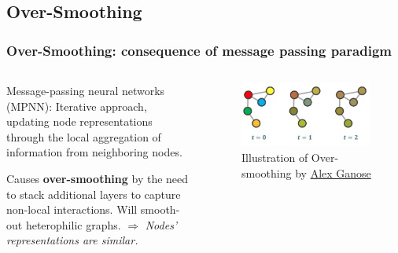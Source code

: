 \documentclass[10pt, aspectratio = 169]{beamer}
\begin{document}
\subsection{Over-Smoothing}
\begin{frame}
    \frametitle{Over-Smoothing: consequence of message passing paradigm}
    \begin{columns}
        \begin{column}{0.6\textwidth}
            \begin{block}{Message-passing neural networks (MPNN):}
                Iterative approach, updating node representations through 
            the local aggregation of information from neighboring nodes.
            \end{block}
            Causes \textbf{over-smoothing} by the need to stack additional layers to capture non-local interactions.
            Will smooth-out heterophilic graphs.
            $\Rightarrow$ \emph{Nodes' representations are similar.}
        \end{column}
        \begin{column}{0.4\textwidth}
            \begin{figure}
                \includegraphics[width=0.99\textwidth]{figures/over_smoothing.png}
                \caption{Illustration of Over-smoothing by 
                \href{https://speakerdeck.com/utf/a-gentle-introduction-to-graph-neural-networks?slide=29}{Alex Ganose}}
            \end{figure}
        \end{column}
    \end{columns}
\end{frame}
\end{document}
